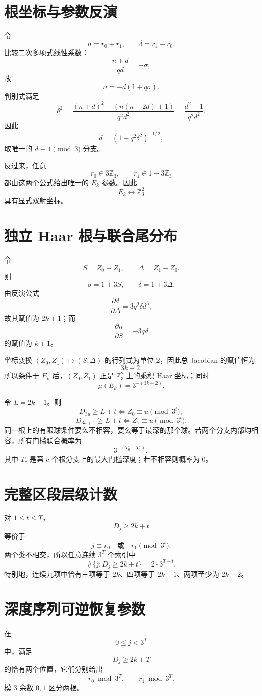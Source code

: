 \documentclass[11pt,a4paper]{ctexart}
\begin{document}
\section{根坐标与参数反演}
令
\[
\sigma=r_0+r_1,\qquad
\delta=r_1-r_0.
\]
比较二次多项式线性系数：
\[
\frac{n+d}{qd}=-\sigma,
\]
故
\[
\boxed{n=-d(1+q\sigma).}
\]
判别式满足
\[
\delta^2
=
\frac{(n+d)^2-(n(n+2d)+1)}{q^2d^2}
=
\frac{d^2-1}{q^2d^2}.
\]
因此
\[
\boxed{
d=(1-q^2\delta^2)^{-1/2},
}
\]
取唯一的 \(d\equiv1\pmod3\) 分支。

反过来，任意
\[
r_0\in3\mathbb Z_3,\qquad
r_1\in1+3\mathbb Z_3
\]
都由这两个公式给出唯一的 \(E_k\) 参数。因此
\[
E_k\longleftrightarrow\mathbb Z_3^2
\]
具有显式双射坐标。

\section{独立 Haar 根与联合尾分布}
令
\[
S=Z_0+Z_1,\qquad
\Delta=Z_1-Z_0.
\]
则
\[
\sigma=1+3S,\qquad
\delta=1+3\Delta.
\]
由反演公式
\[
\frac{\partial d}{\partial\Delta}
=
3q^2\delta d^3,
\]
故其赋值为 \(2k+1\)；而
\[
\frac{\partial n}{\partial S}
=
-3qd
\]
的赋值为 \(k+1\)。

坐标变换 \((Z_0,Z_1)\mapsto(S,\Delta)\) 的行列式为单位 \(2\)，因此总 Jacobian 的赋值恒为
\[
3k+2.
\]
所以条件于 \(E_k\) 后，\((Z_0,Z_1)\) 正是 \(\mathbb Z_3^2\) 上的乘积 Haar 坐标；同时
\[
\mu(E_k)=3^{-(3k+2)}.
\]

令 \(L=2k+1\)。则
\[
D_{3u}\ge L+t
\iff
Z_0\equiv u\pmod{3^t},
\]
\[
D_{3u+1}\ge L+t
\iff
Z_1\equiv u\pmod{3^t}.
\]
同一根上的有限球条件要么不相容，要么等于最深的那个球。若两个分支内部均相容，所有门槛联合概率为
\[
\boxed{
3^{-(T_0+T_1)},
}
\]
其中 \(T_c\) 是第 \(c\) 个根分支上的最大门槛深度；若不相容则概率为 \(0\)。

\section{完整区段层级计数}
对 \(1\le t\le T\)，
\[
D_j\ge2k+t
\]
等价于
\[
j\equiv r_0\quad\text{或}\quad r_1\pmod{3^t}.
\]
两个类不相交，所以任意连续 \(3^T\) 个索引中
\[
\boxed{
\#\{j:D_j\ge2k+t\}
=
2\cdot3^{T-t}.
}
\]
特别地，连续九项中恰有三项等于 \(2k\)、四项等于 \(2k+1\)、两项至少为 \(2k+2\)。

\section{深度序列可逆恢复参数}
在
\[
0\le j<3^T
\]
中，满足
\[
D_j\ge2k+T
\]
的恰有两个位置，它们分别给出
\[
r_0\bmod3^T,\qquad r_1\bmod3^T.
\]
模 \(3\) 余数 \(0,1\) 区分两根。
\end{document}
